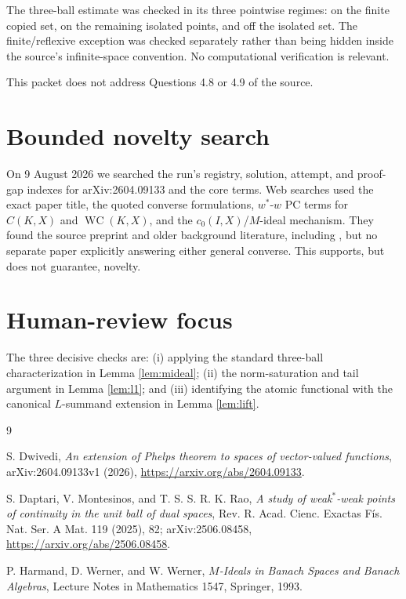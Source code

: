 \documentclass[11pt]{article}
\newcommand{\WC}{\operatorname{WC}}
\begin{document}
The three-ball estimate was checked in its three pointwise regimes: on the
finite copied set, on the remaining isolated points, and off the isolated set.
The finite/reflexive exception was checked separately rather than being hidden
inside the source's infinite-space convention.  No computational verification
is relevant.

This packet does not address Questions 4.8 or 4.9 of the source.

\section*{Bounded novelty search}

On 9 August 2026 we searched the run's registry, solution, attempt, and
proof-gap indexes for arXiv:2604.09133 and the core terms.  Web searches used
the exact paper title, the quoted converse formulations, $w^*$-$w$ PC terms
for $C(K,X)$ and $\WC(K,X)$, and the $c_0(I,X)$/$M$-ideal mechanism.  They
found the source preprint and older background literature, including
\cite{dmr}, but no separate paper explicitly answering either general
converse.  This supports, but does not guarantee, novelty.

\section*{Human-review focus}

The three decisive checks are: (i) applying the standard three-ball
characterization in Lemma \ref{lem:mideal}; (ii) the norm-saturation and tail
argument in Lemma \ref{lem:l1}; and (iii) identifying the atomic functional
with the canonical $L$-summand extension in Lemma \ref{lem:lift}.

\begin{thebibliography}{9}

S. Dwivedi,
\emph{An extension of Phelps theorem to spaces of vector-valued functions},
arXiv:2604.09133v1 (2026),
\url{https://arxiv.org/abs/2604.09133}.

S. Daptari, V. Montesinos, and T. S. S. R. K. Rao,
\emph{A study of weak$^*$-weak points of continuity in the unit ball of dual
spaces}, Rev. R. Acad. Cienc. Exactas F\'is. Nat. Ser. A Mat. 119 (2025), 82;
arXiv:2506.08458,
\url{https://arxiv.org/abs/2506.08458}.

P. Harmand, D. Werner, and W. Werner,
\emph{$M$-Ideals in Banach Spaces and Banach Algebras},
Lecture Notes in Mathematics 1547, Springer, 1993.

\end{thebibliography}
\end{document}
